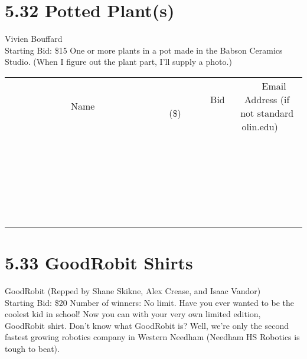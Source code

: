 \documentclass[11pt]{article}
\begin{document}
\section*{5.32 Potted Plant(s)}
Vivien Bouffard
\\
Starting Bid: \$15
\newline
One or more plants in a pot made in the Babson Ceramics Studio.  (When I figure out the plant part, I'll supply a photo.)
\\[6ex]
\begin{tabular}{c c c}
~~~~~~~~~~~~~Name~~~~~~~~~~~~~ & ~~~~~~~~~Bid (\$)~~~~~~~~~  & ~~~Email Address (if not standard olin.edu)~~~\\
 & & \\
\hline
 & & \\
\hline
 & & \\
\hline
 & & \\
\hline
 & & \\
\hline
 & & \\
\hline
 & & \\
\hline
 & & \\
\hline
 & & \\
\hline
 & & \\
\hline
 & & \\
\hline
 & & \\
\hline
 & & \\
\hline
 & & \\
\hline
 & & \\
\hline
 & & \\
\hline
 & & \\
\hline
 & & \\
\hline
 & & \\
\hline
 & & \\
\hline
 & & \\
\hline
 & & \\
\hline
 & & \\
\hline
 & & \\
\hline
 & & \\
\hline
 & & \\
\hline
\end{tabular}
\newpage
\section*{5.33 GoodRobit Shirts}
GoodRobit (Repped by Shane Skikne, Alex Crease, and Isaac Vandor)
\\
Starting Bid: \$20
\newline
Number of winners: No limit.
\newline
Have you ever wanted to be the coolest kid in school! Now you can with your very own limited edition, GoodRobit shirt. Don't know what GoodRobit is? Well, we're only the second fastest growing robotics company in Western Needham (Needham HS Robotics is tough to beat).
\end{document}
